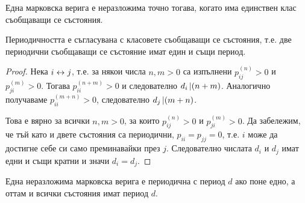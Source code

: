 \documentclass[numbers=endperiod, DIV=15, bibliography=totocnumbered]{scrartcl}
\begin{document}
\begin{corollary}
  Една марковска верига е неразложима точно тогава, когато има единствен клас съобщаващи се състояния.
\end{corollary}

\begin{proposition}
  Периодичността е съгласувана с класовете съобщаващи се състояния, т.е. две периодични съобщаващи се състояние имат един и същи период.
\end{proposition}
\begin{proof}
  Нека $i \leftrightarrow j$, т.е. за някои числа $n, m > 0$ са изпълнени $p_{ij}^{(n)} > 0$ и $p_{ji}^{(m)} > 0$. Тогава $p_{ii}^{(n+m)} > 0$ и следователно $d_i \operatorname{\vert} (n+m)$. Аналогично получаваме $p_{ii}^{(m+n)} > 0$, следователно $d_j \operatorname{\vert} (m+n)$.

  Това е вярно за всички $n, m > 0$, за които $p_{ij}^{(n)} > 0$ и $p_{ji}^{(m)} > 0$. Да забележим, че тъй като и двете състояния са периодични, $p_{ii} = p_{jj} = 0$, т.е. $i$ може да достигне себе си само преминавайки през $j$. Следователно числата $d_i$ и $d_j$ имат едни и същи кратни и значи $d_i = d_j$.
\end{proof}

\begin{corollary}
  Една неразложима марковска верига е периодична с период $d$ ако поне едно, а оттам и всички състояния имат период $d$.
\end{corollary}
\end{document}

